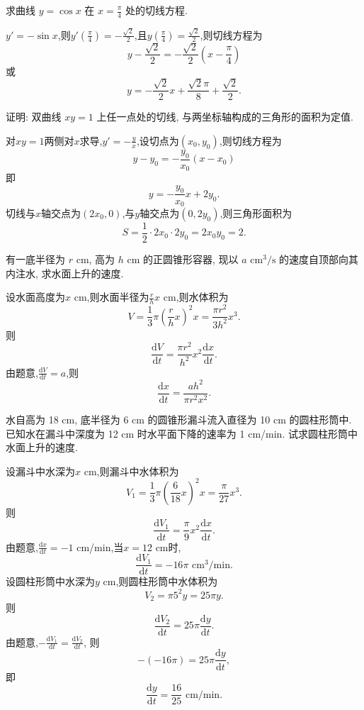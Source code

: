 \begin{exercise}[3.1.23]
    求曲线 $y=\cos x$ 在 $x=\frac{\pi}{4}$ 处的切线方程.
\end{exercise}

\begin{solution}
    $y' = -\sin x$,则$y'(\frac{\pi}{4}) = -\frac{\sqrt{2}}{2}$,且$y(\frac{\pi}{4}) = \frac{\sqrt{2}}{2}$,则切线方程为$$y - \frac{\sqrt{2}}{2} = -\frac{\sqrt{2}}{2} \left( x - \frac{\pi}{4} \right)$$
    或$$y = -\frac{\sqrt{2}}{2} x + \frac{\sqrt{2}\pi}{8} + \frac{\sqrt{2}}{2}.$$
\end{solution}

\begin{exercise}[3.1.24]
    证明: 双曲线 $xy=1$ 上任一点处的切线, 与两坐标轴构成的三角形的面积为定值.
\end{exercise}

\begin{solution}
    对$xy=1$两侧对$x$求导,$y' = -\frac{y}{x}$,设切点为$(x_0,y_0)$,则切线方程为$$y - y_0 = -\frac{y_0}{x_0} (x - x_0)$$
    即$$y = -\frac{y_0}{x_0} x + 2y_0.$$
    切线与$x$轴交点为$(2x_0,0)$,与$y$轴交点为$(0,2y_0)$,则三角形面积为$$S = \frac12 \cdot 2x_0 \cdot 2y_0 = 2x_0 y_0 = 2.$$
\end{solution}

\begin{exercise}[3.1.25]
    有一底半径为 $r$ cm, 高为 $h$ cm 的正圆锥形容器, 现以 $a \text{ cm}^3/\text{s}$ 的速度自顶部向其内注水, 求水面上升的速度.
\end{exercise}

\begin{solution}
    设水面高度为$x$ cm,则水面半径为$\frac{r}{h} x$ cm,则水体积为$$V = \frac13 \pi \left( \frac{r}{h} x \right)^2 x = \frac{\pi r^2}{3h^2} x^3.$$
    则$$\frac{\mathrm{d}V}{\mathrm{d}t} = \frac{\pi r^2}{h^2} x^2 \frac{\mathrm{d}x}{\mathrm{d}t}.$$
    由题意,$\frac{\mathrm{d}V}{\mathrm{d}t} = a$,则$$\frac{\mathrm{d}x}{\mathrm{d}t} = \frac{a h^2}{\pi r^2 x^2}.$$
\end{solution}

\begin{exercise}[3.1.26]
    水自高为 18 cm, 底半径为 6 cm 的圆锥形漏斗流入直径为 10 cm 的圆柱形筒中. 已知水在漏斗中深度为 12 cm 时水平面下降的速率为 1 cm/min. 试求圆柱形筒中水面上升的速度.
\end{exercise}

\begin{solution}
    设漏斗中水深为$x$ cm,则漏斗中水体积为$$V_1 = \frac13 \pi \left( \frac{6}{18} x \right)^2 x = \frac{\pi}{27} x^3.$$
    则$$\frac{\mathrm{d}V_1}{\mathrm{d}t} = \frac{\pi}{9} x^2 \frac{\mathrm{d}x}{\mathrm{d}t}.$$
    由题意,$\frac{\mathrm{d}x}{\mathrm{d}t} = -1$ cm/min,当$x=12$ cm时,$$\frac{\mathrm{d}V_1}{\mathrm{d}t} = -16\pi \text{ cm}^3/\text{min}.$$
    设圆柱形筒中水深为$y$ cm,则圆柱形筒中水体积为$$V_2 = \pi 5^2 y = 25 \pi y.$$
    则$$\frac{\mathrm{d}V_2}{\mathrm{d}t} = 25 \pi \frac{\mathrm{d}y}{\mathrm{d}t}.$$
    由题意,$-\frac{\mathrm{d}V_1}{\mathrm{d}t} = \frac{\mathrm{d}V_2}{\mathrm{d}t}$,
    则$$-\left( -16 \pi \right) = 25 \pi \frac{\mathrm{d}y}{\mathrm{d}t},$$
    即$$\frac{\mathrm{d}y}{\mathrm{d}t} = \frac{16}{25} \text{ cm}/\text{min}.$$
\end{solution}

\newpage
